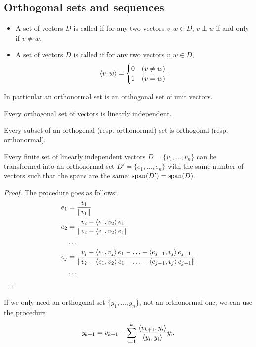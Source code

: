 \subsection{Orthogonal sets and sequences}
\begin{definition}
\begin{itemize}
\item A set of vectors $D$ is called  if for any two vectors $v,w\in D$, $v\perp w$ \textup{if and only if} $v\neq w$.
\item A set of vectors $D$ is called  if for any two vectors $v,w\in D$,
\[ \left\langle v,w \right\rangle = \begin{cases}
0 & (v\neq w) \\ 1 & (v=w)
\end{cases}. \]
\end{itemize}
In particular an orthonormal set is an orthogonal set of unit vectors.
\end{definition}

\begin{lemma} \label{lemma:orthogonalLinearlyIndependent}
Every orthogonal set of vectors is linearly independent.
\end{lemma}
\begin{lemma}
Every subset of an orthogonal (resp. orthonormal) set is orthogonal (resp. orthonormal).
\end{lemma}

\begin{theorem}
Every finite set of linearly independent vectors $D = \{v_1,\ldots, v_n\}$ can be transformed into an orthonormal set $D' = \{e_1,\ldots,e_n\}$ with the same number of vectors such that the spans are the same: $\operatorname{span}(D') = \operatorname{span}(D)$.
\end{theorem}
\begin{proof}
The procedure goes as follows:
\begin{align*}
e_1 &= \frac{v_1}{\lVert v_1\rVert} \\
e_2 &= \frac{v_2 - \left\langle e_1,v_2 \right\rangle e_1}{\lVert v_2 - \left\langle e_1,v_2 \right\rangle e_1\rVert} \\
&\hdots \\
e_j &= \frac{v_j - \left\langle e_1,v_j \right\rangle e_1- \ldots - \left\langle e_{j-1},v_j \right\rangle e_{j-1}}{\lVert v_2 - \left\langle e_1,v_2 \right\rangle e_1- \ldots - \left\langle e_{j-1},v_j \right\rangle e_{j-1}\rVert} \\
&\hdots
\end{align*}
\end{proof}

If we only need an orthogonal set $\{y_1,\ldots,y_n\}$, not an orthonormal one, we can use the procedure
\[ y_{k+1} = v_{k+1} - \sum_{i=1}^k \frac{\left\langle v_{k+1}, y_i \right\rangle}{\left\langle y_i,y_i \right\rangle}y_i. \]

